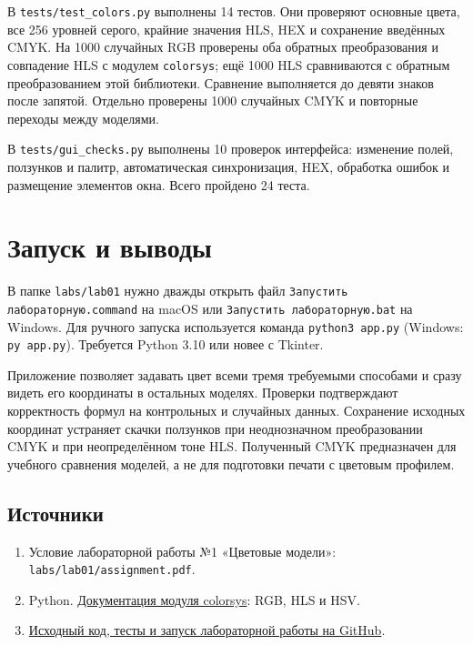 \documentclass[12pt,a4paper]{extarticle}
\newcommand{\code}[1]{\texttt{\small #1}}
\begin{document}
В \code{tests/test\_colors.py} выполнены 14 тестов. Они проверяют основные цвета, все 256 уровней серого, крайние значения HLS, HEX и сохранение введённых CMYK. На 1000 случайных RGB проверены оба обратных преобразования и совпадение HLS с модулем \code{colorsys}; ещё 1000 HLS сравниваются с обратным преобразованием этой библиотеки. Сравнение выполняется до девяти знаков после запятой. Отдельно проверены 1000 случайных CMYK и повторные переходы между моделями.

В \code{tests/gui\_checks.py} выполнены 10 проверок интерфейса: изменение полей, ползунков и палитр, автоматическая синхронизация, HEX, обработка ошибок и размещение элементов окна. Всего пройдено 24 теста.

\section{Запуск и выводы}
В папке \code{labs/lab01} нужно дважды открыть файл \texttt{Запустить лабораторную.command} на macOS или \texttt{Запустить лабораторную.bat} на Windows. Для ручного запуска используется команда \code{python3 app.py} (Windows: \code{py app.py}). Требуется Python 3.10 или новее с Tkinter.

Приложение позволяет задавать цвет всеми тремя требуемыми способами и сразу видеть его координаты в остальных моделях. Проверки подтверждают корректность формул на контрольных и случайных данных. Сохранение исходных координат устраняет скачки ползунков при неоднозначном преобразовании CMYK и при неопределённом тоне HLS. Полученный CMYK предназначен для учебного сравнения моделей, а не для подготовки печати с цветовым профилем.

\subsection*{Источники}
\begin{enumerate}
\item Условие лабораторной работы №1 «Цветовые модели»: \code{labs/lab01/assignment.pdf}.
\item Python. \href{https://docs.python.org/3/library/colorsys.html}{Документация модуля colorsys}: RGB, HLS и HSV.
\item \href{https://github.com/YauheniShe/bsu-computer-graphics/tree/main/labs/lab01}{Исходный код, тесты и запуск лабораторной работы на GitHub}.
\end{enumerate}
\end{document}
